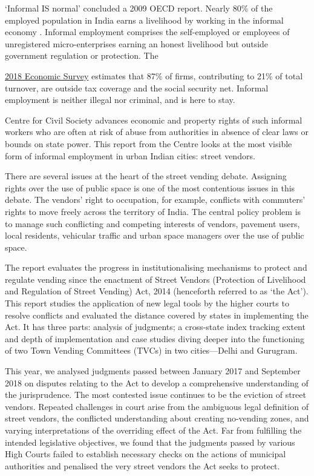 \documentclass[a4paper, 12pt, twoside]{article}
\begin{document}
`Informal IS normal' concluded a 2009 OECD report. Nearly 80\% of the employed population in India earns a livelihood by working in the informal economy \parencite{iloreport}. Informal employment comprises the self-employed or employees of unregistered micro-enterprises earning an honest livelihood but outside government regulation or protection. The {\href{http://mofapp.nic.in:8080/economicsurvey/pdf/032-042_Chapter_02_ENGLISH_Vol_01_2017-18.pdf}{2018 Economic Survey} estimates that 87\% of firms, contributing to 21\% of total turnover, are outside tax coverage and the social security net. Informal employment is neither illegal nor criminal, and is here to stay. 

Centre for Civil Society advances economic and property rights of such informal workers who are often at risk of abuse from authorities in absence of clear laws or bounds on state power. This report from the Centre looks at the most visible form of informal employment in urban Indian cities: street vendors.

There are several issues at the heart of the street vending debate. Assigning rights over the use of public space is one of the most contentious issues in this debate. The vendors’ right to occupation, for example, conflicts with commuters’ rights to move freely across the territory of India. The central policy problem is to manage such conflicting and competing interests of vendors, pavement users, local residents, vehicular traffic and urban space managers over the use of public space. 

The report evaluates the progress in institutionalising mechanisms to protect and regulate vending since the enactment of Street Vendors (Protection of Livelihood and Regulation of Street Vending) Act, 2014 (henceforth referred to as `the Act'). This report studies the application of new legal tools by the higher courts to resolve conflicts and evaluated the distance covered by states in implementing the Act. It has three parts: analysis of judgments; a cross-state index tracking extent and depth of implementation and case studies diving deeper into the functioning of two Town Vending Committees (TVCs) in two cities—Delhi and Gurugram. 

This year, we analysed judgments passed between January 2017 and September 2018 on disputes relating to the Act to develop a comprehensive understanding of the jurisprudence. The most contested issue continues to be the eviction of street vendors. Repeated challenges in court arise from the ambiguous legal definition of street vendors, the conflicted understanding about creating no-vending zones, and varying interpretations of the overriding effect of the Act. Far from fulfilling the intended legislative objectives, we found that the judgments passed by various High Courts failed to establish necessary checks on the actions of municipal authorities and penalised the very street vendors the Act seeks to protect.

}
\end{document}
